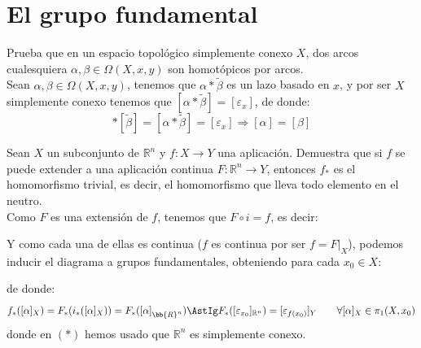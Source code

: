 \section{El grupo fundamental}
\begin{ejercicio}
    Prueba que en un espacio topológico simplemente conexo $X$, dos arcos cualesquiera $\alpha,\beta\in \Omega(X,x,y)$ son homotópicos por arcos.\\

    \noindent
    Sean $\alpha,\beta\in \Omega(X,x,y)$, tenemos que $\alpha\ast\tilde{\beta}$ es un lazo basado en $x$, y por ser $X$ simplemente conexo tenemos que $\left[\alpha\ast\tilde{\beta}\right] = [\varepsilon_x]$, de donde:
    \begin{equation*}
        [\alpha]\ast\left[\tilde{\beta}\right] = \left[\alpha\ast\tilde{\beta}\right] = [\varepsilon_x] \Longrightarrow [\alpha] = [\beta]
    \end{equation*}
\end{ejercicio}

\begin{ejercicio}
    Sean $X$ un subconjunto de $\mathbb{R}^n$ y $f:X\to Y$ una aplicación. Demuestra que si $f$ se puede extender a una aplicación continua $F:\mathbb{R}^n\to Y$, entonces $f_\ast$ es el homomorfismo trivial, es decir, el homomorfismo que lleva todo elemento en el neutro.\\

    \noindent
    Como $F$ es una extensión de $f$, tenemos que $F\circ i = f$, es decir:
    \begin{figure}[H]
        \centering
    \end{figure}
    \noindent
    Y como cada una de ellas es continua ($f$ es continua por ser $f=F\big|_X$), podemos inducir el diagrama a grupos fundamentales, obteniendo para cada $x_0\in X$:
    \begin{figure}[H]
        \centering
    \end{figure}
    de donde:
    \begin{equation*}
        f_\ast([\alpha]_X) = F_\ast(i_\ast([\alpha]_{X})) = F_\ast({[\alpha]}_{\bb{R}^n}) \AstIg F_\ast([\varepsilon_{x_0}]_{\mathbb{R}^n}) = [\varepsilon_{f(x_0)}]_Y \qquad \forall [\alpha]_X \in \pi_1(X,x_0)
    \end{equation*}
    donde en $(\ast)$ hemos usado que $\mathbb{R}^n$ es simplemente conexo.
\end{ejercicio}

